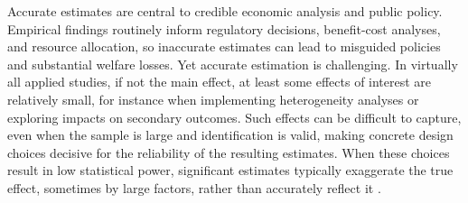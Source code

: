 \documentclass[12pt]{article}
\begin{document}
\onehalfspacing




	
		\noindent Accurate estimates are central to credible economic analysis and public policy. Empirical findings routinely inform regulatory decisions, benefit-cost analyses, and resource allocation, so inaccurate estimates can lead to misguided policies and substantial welfare losses. Yet accurate estimation is challenging. In virtually all applied studies, if not the main effect, at least some effects of interest are relatively small, for instance when implementing heterogeneity analyses or exploring impacts on secondary outcomes. Such effects can be difficult to capture, even when the sample is large and identification is valid, making concrete design choices decisive for the reliability of the resulting estimates. When these choices result in low statistical power, significant estimates typically exaggerate the true effect, sometimes by large factors, rather than accurately reflect it \citep{gelman_type_2000}. 
		
		
\end{document}
